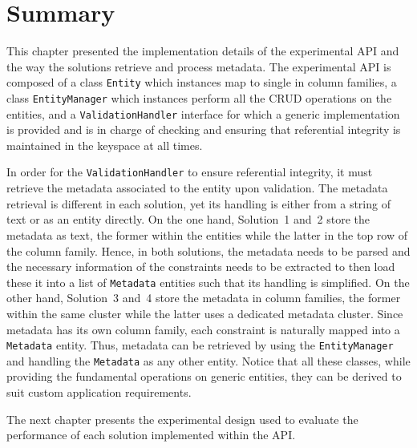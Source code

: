 
	


% 
% 
% 
% 
%  
% 
%   

\section{Summary}\label{s:Implementation-summary}

This chapter presented the implementation details of the experimental \ac{API}
and the way the solutions retrieve and process metadata. The experimental
\ac{API} is composed of a class \texttt{Entity} which instances map to
single  in column families,  a class \texttt{EntityManager} which
instances perform all the \ac{CRUD} operations on the entities, and a  
\texttt{ValidationHandler} interface for which a generic implementation is
provided and is in charge of checking and ensuring that referential integrity is
maintained in the keyspace at all times.  

In order for the \texttt{ValidationHandler} to ensure referential integrity, it
must retrieve the metadata associated to the entity upon validation. The
metadata retrieval is different in each solution, yet its handling is either
from a string of text or as an entity directly. On the one hand, Solution~1
and~2 store the metadata as text, the former  within the entities while the latter in the top
row of the column family. Hence, in both solutions, the
metadata needs to be parsed and the  necessary information  of 
the constraints needs to be extracted to then load these it into
a list of \texttt{Metadata} entities such that its handling is simplified. On
the other hand, Solution~3 and~4 store the metadata in column families, the
former within the same cluster while the latter uses a dedicated metadata
 cluster. Since metadata has its own column family, each constraint is naturally
 mapped into a \texttt{Metadata} entity. Thus, metadata can be   retrieved by
 using the \texttt{EntityManager} and handling the \texttt{Metadata} as any
other entity. Notice that all these classes, while providing the
 fundamental operations on generic entities, they can be derived to suit custom
application requirements.
   

The next chapter presents the experimental design used to evaluate  the
performance of each solution implemented within the \ac{API}.

